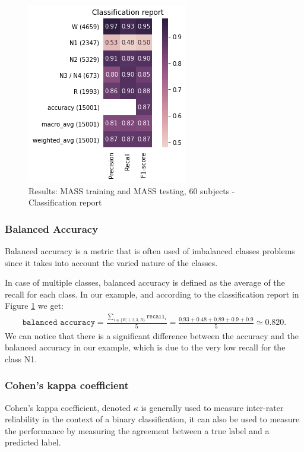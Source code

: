 \documentclass[titlepage, 11pt, a4paper, fancysections]{article}
\begin{document}
\begin{figure}[!ht]
    \centering 
    \hspace{-30mm}
    \includegraphics[width=.6\linewidth]{metrics/class_report.png} 
    \caption{Results: MASS training and MASS testing, 60 subjects - Classification report} 
    \label{fig:class_report} 
\end{figure}

\subsubsection{Balanced Accuracy}
Balanced accuracy is a metric that is often used of imbalanced classes problems since it takes into account the varied nature of the classes. 

In case of multiple classes, balanced accuracy is defined as the average of the recall for each class. In our example, and according to the classification report in Figure \ref{fig:class_report} we get:
\begin{align*}
   \texttt{balanced accuracy}= \frac{\sum_{i \in \{W, 1, 2, 3, R\}}\texttt{recall}_i}{5}= \frac{0.93+0.48+0.89+0.9+0.9}{5} \simeq 0.820.
\end{align*}
We can notice that there is a significant difference between the accuracy and the balanced accuracy in our example, which is due to the very low recall for the class N1.

\subsubsection{Cohen's kappa coefficient}
Cohen's kappa coefficient, denoted $\kappa$ is generally used to measure inter-rater reliability in the context of a binary classification, it can also be used to measure the performance by measuring the agreement between a true label and a predicted label. 
\end{document}
